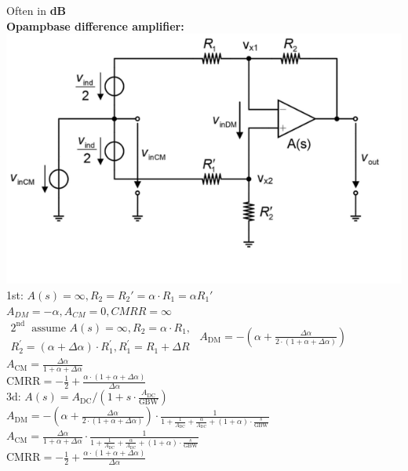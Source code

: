 \documentclass[5pt]{article}
\begin{document}
\begin{multicols*}{4}
Often in \textbf{dB}\\
\textbf{Opampbase difference amplifier:}\\
\includegraphics[width=\columnwidth]{images/diffbased_opamp.png}\\
1st: $ A(s) = \infty, R_2 = R_2' = \alpha \cdot R_1 = \alpha R_1'$\\
$ A_{DM} = - \alpha, A_{CM} =0, CMRR = \infty $ \\
$ \begin{array}{l}
2^{\text {nd }} \text { assume } A(s)=\infty, R_{2}=\alpha \cdot R_{1}, \\
R_{2}^{\prime}=(\alpha+\Delta \alpha) \cdot R_{1}^{\prime}, R_{1}^{\prime}=R_{1}+\Delta R
\end{array} $
$ 
A_{\mathrm{DM}} =-\left( \alpha+\frac{\Delta \alpha}{2 \cdot(1+\alpha+\Delta \alpha)} \right)$ \\
$A_{\mathrm{CM}} =\frac{\Delta \alpha}{1+\alpha+\Delta \alpha} $\\
$\mathrm{CMRR} =-\frac{1}{2}+\frac{\alpha \cdot(1+\alpha+\Delta \alpha)}{\Delta \alpha}
$\\
3d: $ A(s)=A_{\mathrm{DC}} /\left(1+s \cdot \frac{A_{\mathrm{DC}}}{\mathrm{GBW}}\right) $\\
$ A_{\mathrm{DM}} =-\left(\alpha+\frac{\Delta \alpha}{2 \cdot(1+\alpha+\Delta \alpha)}\right) \cdot \frac{1}{1+\frac{1}{A_{\mathrm{DC}}}+\frac{\alpha}{A_{\mathrm{DC}}}+(1+\alpha) \cdot \frac{s}{\mathrm{GBW}}} $\\
$A_{\mathrm{CM}} =\frac{\Delta \alpha}{1+\alpha+\Delta \alpha} \cdot \frac{1}{1+\frac{1}{A_{\mathrm{DC}}}+\frac{\alpha}{A_{\mathrm{DC}}}+(1+\alpha) \cdot \frac{s}{\mathrm{GBW}}}$ \\
$\mathrm{CMRR} =-\frac{1}{2}+\frac{\alpha \cdot(1+\alpha+\Delta \alpha)}{\Delta \alpha}$

\end{multicols*}
\end{document}

